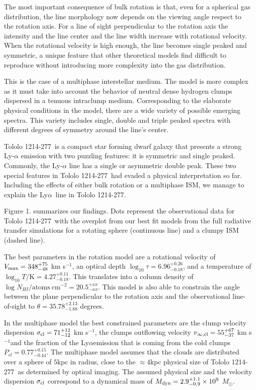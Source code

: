 \documentclass[a4paper, usenatbib, 12pt]{article}
\newcommand{\tol}{Tololo 1214-277}
\newcommand{\lya}{Ly$\alpha$}
\newcommand{\kms}{km s$^{-1}$}
\begin{document}
{The most important consequence of bulk rotation is that, even for a
spherical gas distribution, the line morphology now depends on the
viewing angle respect to the rotation axis.  
For a line of sight perpendicular to the rotation axis the intensity
and the line center and the line width increase with rotational
velocity. 
When the rotational velocity is high enough, the line becomes single
peaked and symmetric, a unique feature that other theoretical models
find difficult to reproduce without introducing more complexity into
the gas distribution.  

This is the case of a multiphase interstellar medium.
The model is more complex as it must take into account the behavior
of neutral dense hydrogen clumps dispersed in a tenuous intraclump medium.  
Corresponding to the elaborate physical conditions in the model,
there are a wide variety of possible emerging spectra.
This variety includes single, double and triple peaked
spectra with different degrees of symmetry around the line's center.


\tol\ is a compact star forming dwarf galaxy that presents a
strong Ly-$\alpha$ emission \cite{Thuan97} with two puzzling 
features: it is symmetric and single peaked.
Commonly, the Ly-$\alpha$ line has a single or asymmetric double peak. 
These two special features in \tol\ had evaded a physical
interpretation so far. 
Including the effects of either bulk rotation or a multiphase ISM, we
manage to explain the \lya\ line in \tol.  

Figure 1. summarizes our findings.
Dots represent the observational data for \tol\ with the
overplot from our best fit models from the full radiative transfer
simulations for a rotating sphere (continuous line) and a clumpy ISM
(dashed line).

The best parameters in the rotation model are a rotational velocity of 
$V_{\rm max}=348^{+75}_{-48}$ \kms, an optical depth $\log_{10}\tau=6.96^{+0.26}_{-0.18}$,  and a temperature of $\log_{10} T/\mathrm {K} = 4.27^{+0.11}_{-0.18}$. 
This translates into a column density of $\log N_{HI} /
\mathrm{atoms\ cm}^{-2} =  20.5^{+xx}_{-xx}$.  
This model is also able to constrain the angle between the plane perpendicular to the rotation axis and the observational line-of-sight to
$\theta = 35.78^{+2.13}_{-1.88}$ degrees.

In the multiphase model the best constrained parameters are
the clump velocity dispersion  $\sigma_{\rm{cl}}=71^{+12}_{-12}$ \kms,
the clumps outflowing velocity $v_{\infty, \rm{cl}}=55^{+67}_{-37}$
\kms and the fraction of the \lya emission that is  coming
from the cold clumps  
$P_{cl}=0.77^{+0.15}_{-0.44}$. 
The multiphase model assumes that the clouds are distributed over a
sphere of $5$kpc in radius, close to the $\approx 4$kpc physical size
of \tol\ as determined by optical imaging.
The assumed physical size and the velocity dispersion $\sigma_{\rm
  cl}$ correspond to a  dynamical mass of  $M_{\rm
  dyn}=2.9^{+1.1}_{-0.9}\times 10^{9}$ $M_{\odot}$.

}
\end{document}
